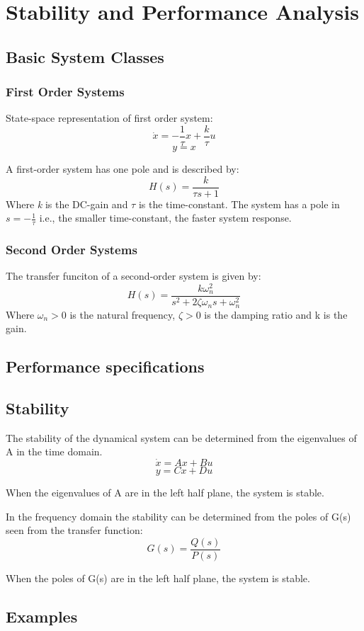 \section{Stability and Performance Analysis}

\subsection{Basic System Classes}

\subsubsection{First Order Systems}
State-space representation of first order system:
$$\dot{x} = -\frac{1}{\tau}x+\frac{k}{\tau}u$$
$$y=x$$

A first-order system has one  pole and is described by:
$$H(s)=\frac{k}{\tau s+1}$$
Where \emph{k} is the DC-gain and $\tau$ is the time-constant. The system has a pole
in $s=-\frac{1}{\tau}$ i.e., the smaller time-constant, the faster system response.


\subsubsection{Second Order Systems}
The transfer funciton of a second-order system is given by:
$$H(s) = \frac{k \omega_n^2}{s^2+2\zeta\omega_n s+\omega_n^2}$$
Where $\omega_n>0$ is the natural frequency, $\zeta>0$ is the damping ratio and k is the gain.



\subsection{Performance specifications}
\subsection{Stability}
The stability of the dynamical system can be determined from the eigenvalues of A in the time domain.
$$\dot{x} = Ax+Bu$$
$$y=Cx+Du$$

When the eigenvalues of A are in the left half plane, the system is stable.


In the frequency domain the stability can be determined from the poles of G(s) seen from the transfer function:
$$G(s) = \frac{Q(s)}{P(s)}$$

When the poles of G(s) are in the left half plane, the system is stable.



\subsection{Examples}
